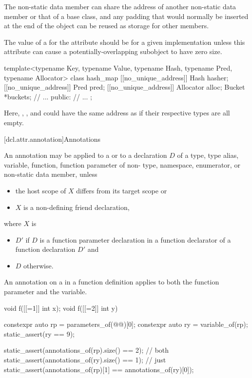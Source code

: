 \pnum
\begin{note}
The non-static data member can share the address of
another non-static data member or that of a base class,
and any padding that would normally be inserted
at the end of the object
can be reused as storage for other members.
\end{note}

\recommended
The value of a 
for the  attribute
should be  for a given implementation
unless this attribute can cause a potentially-overlapping subobject
to have zero size.

\begin{example}
\begin{codeblock}
template<typename Key, typename Value,
         typename Hash, typename Pred, typename Allocator>
class hash_map {
  [[no_unique_address]] Hash hasher;
  [[no_unique_address]] Pred pred;
  [[no_unique_address]] Allocator alloc;
  Bucket *buckets;
  // ...
public:
  // ...
};
\end{codeblock}
Here, , , and 
could have the same address as 
if their respective types are all empty.
\end{example}

[dcl.attr.annotation]{Annotations}%

\pnum
An annotation may be applied
to a  or
to a declaration $D$ of a
type,
type alias,
variable,
function,
function parameter of non- type,
namespace,
enumerator, or
non-static data member,
unless
\begin{itemize}
\item the host scope of $X$ differs from its target scope or
\item $X$ is a non-defining friend declaration,
\end{itemize}
where $X$ is
\begin{itemize}
\item
$D'$ if $D$ is a function parameter declaration in
a function declarator of a function declaration $D'$ and
\item $D$ otherwise.
\end{itemize}
\begin{note}
An annotation on a  in a function definition
applies to both the function parameter and the variable.
\begin{example}
\begin{codeblock}
void f([[=1]] int x);
void f([[=2]] int y) {
  constexpr auto rp = parameters_of(@@)[0];
  constexpr auto ry = variable_of(rp);
  static_assert(ry == ^^y);

  static_assert(annotations_of(rp).size() == 2);    // both \tcode{[1, 2]}
  static_assert(annotations_of(ry).size() == 1);    // just \tcode{[2]}
  static_assert(annotations_of(rp)[1] == annotations_of(ry)[0]);
}
\end{codeblock}
\end{example}
\end{note}

